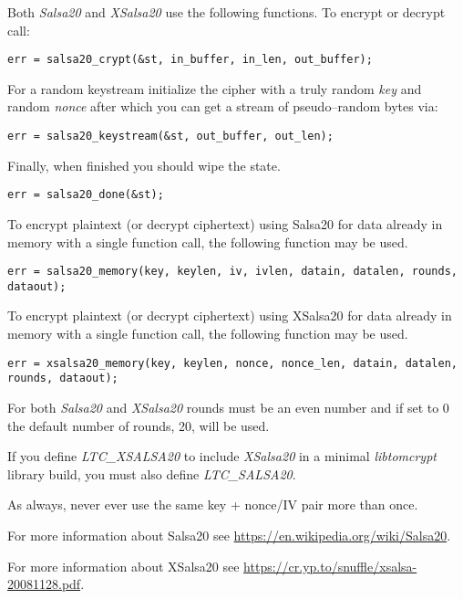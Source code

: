 \documentclass[synpaper]{book}
\begin{document}
Both \textit{Salsa20} and \textit{XSalsa20} use the following functions.  To
encrypt or decrypt call:
\begin{verbatim}
err = salsa20_crypt(&st, in_buffer, in_len, out_buffer);
\end{verbatim}

For a random keystream initialize the cipher with a truly random \textit{key}
and random \textit{nonce} after which you can get a stream of
pseudo--random bytes via:
\begin{verbatim}
err = salsa20_keystream(&st, out_buffer, out_len);
\end{verbatim}

Finally, when finished you should wipe the state.
\begin{verbatim}
err = salsa20_done(&st);
\end{verbatim}

To encrypt plaintext (or decrypt ciphertext) using Salsa20 for data already in
memory with a single function call, the following function may be used.
\begin{verbatim}
err = salsa20_memory(key, keylen, iv, ivlen, datain, datalen, rounds, dataout);
\end{verbatim}

To encrypt plaintext (or decrypt ciphertext) using XSalsa20 for data already in
memory with a single function call, the following function may be used.
\begin{verbatim}
err = xsalsa20_memory(key, keylen, nonce, nonce_len, datain, datalen, rounds, dataout);
\end{verbatim}

For both \textit{Salsa20} and \textit{XSalsa20} rounds must be an even number
and if set to 0 the default number of rounds, 20, will be used.
\vspace{1mm}

If you define \textit{LTC\_XSALSA20} to include \textit{XSalsa20} in a minimal
\textit{libtomcrypt} library build, you must also define \textit{LTC\_SALSA20}.
\vspace{1mm}

As always, never ever use the same key + nonce/IV pair more than once.
\vspace{1mm}

For more information about Salsa20 see
\url{https://en.wikipedia.org/wiki/Salsa20}.
\vspace{1mm}

For more information about XSalsa20 see
\url{https://cr.yp.to/snuffle/xsalsa-20081128.pdf}.
\vspace{1mm}
\end{document}
